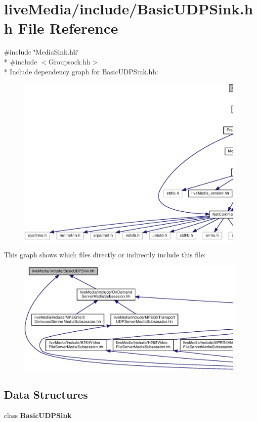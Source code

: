 \section{live\+Media/include/\+Basic\+U\+D\+P\+Sink.hh File Reference}
\label{BasicUDPSink_8hh}
{\ttfamily \#include \char`\"{}Media\+Sink.\+hh\char`\"{}}\\*
{\ttfamily \#include $<$Groupsock.\+hh$>$}\\*
Include dependency graph for Basic\+U\+D\+P\+Sink.\+hh\+:
\nopagebreak
\begin{figure}[H]
\begin{center}
\leavevmode
\includegraphics[width=350pt]{BasicUDPSink_8hh__incl}
\end{center}
\end{figure}
This graph shows which files directly or indirectly include this file\+:
\nopagebreak
\begin{figure}[H]
\begin{center}
\leavevmode
\includegraphics[width=350pt]{BasicUDPSink_8hh__dep__incl}
\end{center}
\end{figure}
\subsection*{Data Structures}
\begin{DoxyCompactItemize}
\item 
class {\bf Basic\+U\+D\+P\+Sink}
\end{DoxyCompactItemize}
